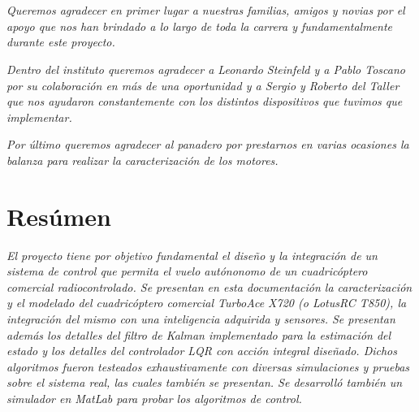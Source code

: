 \documentclass[main]{subfiles}
\begin{document}
\chapter*{}
\begin{flushright}
\textit{
Queremos agradecer en primer lugar a nuestras familias, amigos y novias 
por el apoyo que nos han brindado a lo largo de
toda la carrera y fundamentalmente durante este proyecto.}
\end{flushright}

\begin{flushright}
\textit{
Dentro del instituto queremos agradecer a Leonardo Steinfeld y a Pablo Toscano por su colaboraci\'on en m\'as de una oportunidad y a Sergio y Roberto del Taller que nos ayudaron constantemente con los distintos dispositivos que tuvimos que implementar.
}
\end{flushright} 

\begin{flushright}
\textit{
Por \'ultimo queremos agradecer al panadero por prestarnos en varias ocasiones la balanza para realizar la caracterizaci\'on de los motores.
}
\end{flushright}



\chapter*{Res\'umen}
\begin{flushright}
\textit{El proyecto tiene por objetivo fundamental el diseño y la integración de un sistema de control que permita el vuelo autónonomo de un cuadricóptero comercial radiocontrolado. Se presentan en esta documentaci\'on la caracterizaci\'on y el modelado del cuadric\'optero comercial TurboAce X720 (o LotusRC T850), la integraci\'on del mismo con una inteligencia adquirida y sensores. Se presentan adem\'as los detalles del filtro de Kalman implementado para la estimaci\'on del estado y los detalles del controlador LQR con acci\'on integral dise\~nado. Dichos algoritmos fueron testeados exhaustivamente con diversas simulaciones y pruebas sobre el sistema real, las cuales tambi\'en se presentan. Se desarroll\'o tambi\'en un simulador en \emph{MatLab} para probar los algoritmos de control.
}
\end{flushright}
\end{document}
